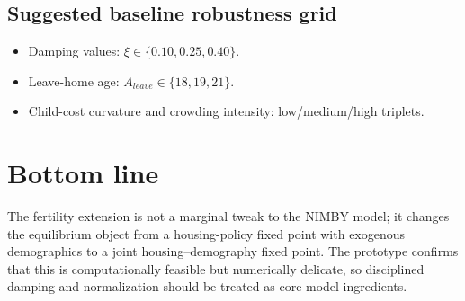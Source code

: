 \documentclass[11pt]{article}
\begin{document}
\subsection*{Suggested baseline robustness grid}
\begin{itemize}
\item Damping values: $\xi\in\{0.10,0.25,0.40\}$.
\item Leave-home age: $A_{leave}\in\{18,19,21\}$.
\item Child-cost curvature and crowding intensity: low/medium/high triplets.
\end{itemize}

\section*{Bottom line}
The fertility extension is not a marginal tweak to the NIMBY model; it changes the equilibrium object from a housing-policy fixed point with exogenous demographics to a joint housing--demography fixed point. The prototype confirms that this is computationally feasible but numerically delicate, so disciplined damping and normalization should be treated as core model ingredients.
\end{document}

